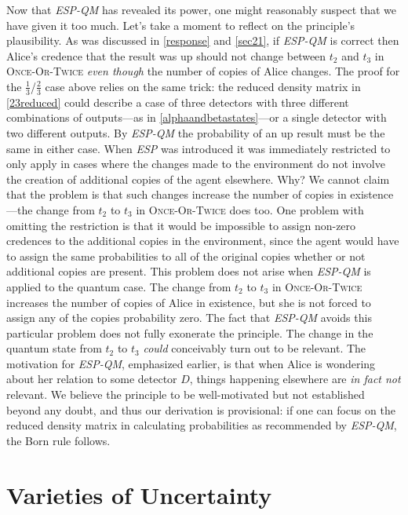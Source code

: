 \documentclass[onecolumn,secnumarabic,amsmath,amssymb,balancelastpage,nofootinbib]{article}
\begin{document}
Now that \emph{ESP-QM} has revealed its power, one might reasonably suspect that we have given it too much.  Let's take a moment to reflect on the principle's plausibility.  As was discussed in \textsection \ref{response} and \ref{sec21}, if \emph{ESP-QM} is correct then Alice's credence that the result was up should not change between $t_2$ and $t_3$ in \textsc{Once-Or-Twice} \emph{even though} the number of copies of Alice changes.  The proof for the $\frac{1}{3}$/$\frac{2}{3}$ case above relies on the same trick: the reduced density matrix in \eqref{23reduced} could describe a case of three detectors with three different combinations of outputs---as in \eqref{alphaandbetastates}---or a single detector with two different outputs.  By \emph{ESP-QM} the probability of an up result must be the same in either case.  When \emph{ESP} was introduced it was immediately restricted to only apply in cases where the changes made to the environment do not involve the creation of additional copies of the agent elsewhere.  Why?  We cannot claim that the problem is that such changes increase the number of copies in existence---the change from $t_2$ to $t_3$ in \textsc{Once-Or-Twice} does too.  One problem {with omitting the restriction is that it would be} impossible to assign non-zero credences to the additional copies in the environment, since the agent {would have to} assign the same probabilities to all of the original copies whether or not additional copies are present.  This problem does not arise when \emph{ESP-QM} is applied to the quantum case.  The change from $t_2$ to $t_3$ in \textsc{Once-Or-Twice} increases the number of copies of Alice in existence, but she is not forced to assign any of the copies probability zero.  The fact that \emph{ESP-QM} avoids this particular problem does not fully exonerate the principle.  The change in the quantum state from $t_2$ to $t_3$ \emph{could} conceivably turn out to be relevant.  The motivation for \emph{ESP-QM}, emphasized earlier, is that when Alice is wondering about her relation to some detector $D$, things happening elsewhere are \emph{in fact not} relevant.  We believe the principle to be well-motivated but not established beyond any doubt, and thus our derivation is provisional: if one can focus on the reduced density matrix in calculating probabilities as recommended by \emph{ESP-QM}, the Born rule follows.


\section{Varieties of Uncertainty}\label{varieties}
\end{document}
